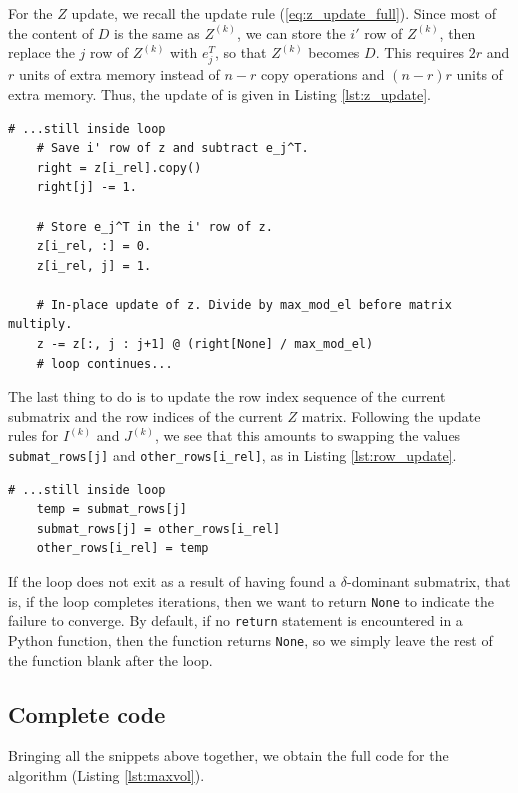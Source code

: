 \documentclass{article}
\begin{document}
	For the $Z$ update, we recall the update rule (\ref{eq:z_update_full}). Since most of the content of $D$ is the same as $Z^{(k)}$, we can store the $i'$ row of $Z^{(k)}$, then replace the $j$ row of $Z^{(k)}$ with $e_j^T$, so that $Z^{(k)}$ becomes $D$. This requires $2r$ and $r$ units of extra memory instead of $n-r$ copy operations and $(n-r)r$ units of extra memory. Thus, the update of \vz{} is given in Listing \ref{lst:z_update}.
	\begin{lstlisting}[caption={$Z$ update}, label=lst:z_update]
    # ...still inside loop
    # Save i' row of z and subtract e_j^T.
    right = z[i_rel].copy()
    right[j] -= 1.

    # Store e_j^T in the i' row of z.
    z[i_rel, :] = 0.
    z[i_rel, j] = 1.

    # In-place update of z. Divide by max_mod_el before matrix multiply.
    z -= z[:, j : j+1] @ (right[None] / max_mod_el)
    # loop continues...
	\end{lstlisting}
	
	
	The last thing to do is to update the row index sequence of the current submatrix and the row indices of the current $Z$ matrix. Following the update rules for $I^{(k)}$ and $J^{(k)}$, we see that this amounts to swapping the values \texttt{submat\_rows[j]} and \texttt{other\_rows[i\_rel]}, as in Listing \ref{lst:row_update}.
	\begin{lstlisting}[caption={row index update}, label=lst:row_update]
    # ...still inside loop
    temp = submat_rows[j]
    submat_rows[j] = other_rows[i_rel]
    other_rows[i_rel] = temp
	\end{lstlisting}
	
	
	If the loop does not exit as a result of having found a $\delta$-dominant submatrix, that is, if the loop completes \vmaxiter{} iterations, then we want to return \texttt{None} to indicate the failure to converge. By default, if no \texttt{return} statement is encountered in a Python function, then the function returns \texttt{None}, so we simply leave the rest of the function blank after the loop.
	
	\subsection{Complete code}
	Bringing all the snippets above together, we obtain the full code for the \maxvol{} algorithm (Listing \ref{lst:maxvol}).
	
	
\end{document}
